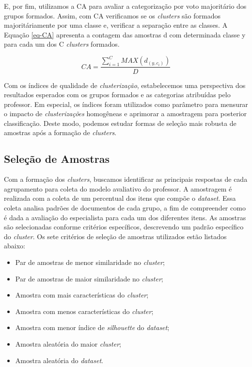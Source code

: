 E, por fim, utilizamos a CA para avaliar a categorização por voto majoritário dos grupos formados. Assim, com CA verificamos se os \textit{clusters} são formados majoritáriamente por uma classe e, verificar a separação entre as classes. A Equação \ref{eq-CA} apresenta a contagem das amostras d com determinada classe y para cada um dos C \textit{clusters} formados.

\begin{equation}
CA = \frac{\sum_{i=1}^{C} MAX(d_{(y, c_{i})})}{D}
\label{eq-CA}
\end{equation}

Com os índices de qualidade de \textit{clusterização}, estabelecemos uma perspectiva dos resultados esperados com os grupos formados e as categorias atribuídas pelo professor. Em especial, os índices foram utilizados como parâmetro para mensurar o impacto de \textit{clusterizações} homogêneas e aprimorar a amostragem para posterior classificação. Deste modo, podemos estudar formas de seleção mais robusta de amostras após a formação de \textit{clusters}.


\subsection{Seleção de Amostras}
\label{subsec-selecao-amostras}

Com a formação dos \textit{clusters}, buscamos identificar as principais respostas de cada agrupamento para coleta do modelo avaliativo do professor. A amostragem é realizada com a coleta de um percentual dos itens que compõe o \textit{dataset}. Essa coleta analisa padrões de documentos de cada grupo, a fim de compreender como é dada a avaliação do especialista para cada um dos diferentes itens. As amostras são selecionadas conforme critérios específicos, descrevendo um padrão específico do \textit{cluster}. Os sete critérios de seleção de amostras utilizados estão listados abaixo:

\begin{itemize}
	\item Par de amostras de menor similaridade no \textit{cluster};
	\item Par de amostras de maior similaridade no \textit{cluster};
	\item Amostra com mais características do \textit{cluster};
	\item Amostra com menos características do \textit{cluster};
	\item Amostra com menor índice de \textit{silhouette} do \textit{dataset};
	\item Amostra aleatória do maior \textit{cluster};
	\item Amostra aleatória do \textit{dataset}.
\end{itemize}

